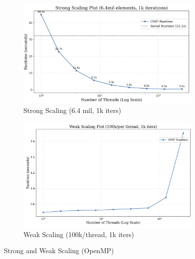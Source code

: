 \documentclass[a4paper,10pt]{article}
\begin{document}
\begin{figure}[b]
     \centering
     \begin{subfigure}[b]{0.45\textwidth}
         \centering
         \includegraphics[width=\textwidth]{../images/2_openmp/strong_scaling.png}
         \caption{Strong Scaling (6.4 mil, 1k iters)}
         \label{fig:2_omp_strong_scaling}
     \end{subfigure}
     \hfill
     \begin{subfigure}[b]{0.45\textwidth}
         \centering
         \includegraphics[width=\textwidth]{../images/2_openmp/weak_scaling.png}
         \caption{Weak Scaling (100k/thread, 1k iters)}
         \label{fig:2_omp_weak_scaling}
     \end{subfigure}
     \caption{Strong and Weak Scaling (OpenMP) }
     \label{fig:2_omp_strong_weak}
\end{figure}
\end{document}
